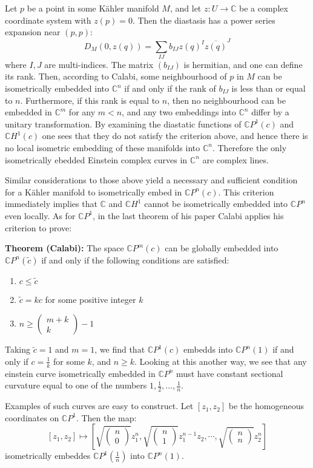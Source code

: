 \documentclass[11pt]{amsart}
\theoremstyle{definition}
\def \CP{ \mathbb{C}P }
\def \C{ \mathbb{C} }
\def \CH{ \mathbb{C}H }
\begin{document}
Let $p$ be a point in some K\"{a}hler manifold $M$, and let $z:U \rightarrow \C$ be a complex coordinate system with $z(p) = 0$.  Then the diastasis has a power series expansion near $(p,p)$:
%
$$ D_M(0, z(q)) = \sum_{IJ} b_{IJ} z(q)^I \overline{z(q)}^J $$
%
where $I,J$ are multi-indices.  The matrix $(b_{IJ})$ is hermitian, and one can define its rank.  Then, according to Calabi, some neighbourhood of $p$ in $M$ can be isometrically embedded into $\C^n$ if and only if the rank of $b_{IJ}$ is less than or equal to $n$.  Furthermore, if this rank is equal to $n$, then no neighbourhood can be embedded in $\C^{m}$ for any $m < n$, and any two embeddings into $\C^n$ differ by a unitary transformation.  By examining the diastatic functions of $\CP^{1}(c)$ and $\CH^{1}(c)$ one sees that they do not satisfy the criterion above, and hence there is no local isometric embedding of these manifolds into $\C^n$.  Therefore the only isometrically ebedded Einstein complex curves in $\C^n$ are complex lines.

Similar considerations to those above yield a necessary and sufficient condition for a K\"{a}hler manifold to isometrically embed in $\CP^n(c)$.   This criterion immediately implies that $\C$ and $\CH^1$ cannot be isometrically embedded into $\CP^n$ even locally.  As for $\CP^1$, in the last theorem of his paper Calabi applies his criterion to prove:

{\bf Theorem (Calabi):} The space $\CP^{m}(c)$ can be globally embedded into $\CP^{n}(\tilde{c})$ if and only if the following conditions are satisfied:
\begin{enumerate}
\item $c \leq \tilde{c}$
\item $\tilde{c} = k c$ for some positive integer $k$
\item $ n \geq \left( \begin{array}{c} m + k \\ k \end{array} \right) - 1 $
\end{enumerate}

Taking $\tilde{c} = 1$ and $m = 1$, we find that $\CP^1(c)$ embedds into $\CP^n(1)$ if and only if $c = \frac{1}{k}$ for some $k$, and $n \geq k$.  Looking at this another way, we see that any einstein curve isometrically embedded in $\CP^{n}$ must have constant sectional curvature equal to one of the numbers $1, \frac{1}{2}, \ldots, \frac{1}{n}$.

Examples of such curves are easy to construct.  Let $[z_1, z_2]$ be the homogeneous coordinates on $\CP^1$.  Then the map:
%
$$ [z_1, z_2] \mapsto \left[ \sqrt{ \left( \begin{array}{c} n \\ 0 \end{array} \right) } z_1^n, \sqrt{ \left( \begin{array}{c} n \\ 1 \end{array} \right) } z_1^{n-1} z_2, \cdots, \sqrt{ \left( \begin{array}{c} n \\ n \end{array} \right) } z_2^n \right] $$ 
%
isometrically embeddes $\CP^1(\frac{1}{n})$ into $\CP^n(1)$.
\end{document}
